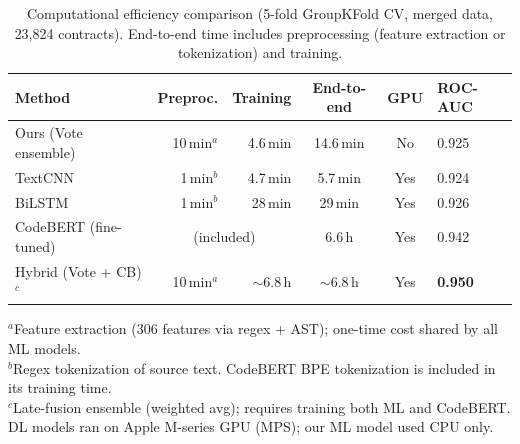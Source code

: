 \begin{table}[t]
\centering
\caption{Computational efficiency comparison (5-fold GroupKFold CV, merged data, 23,824 contracts). End-to-end time includes preprocessing (feature extraction or tokenization) and training.}
\label{tab:efficiency}
\small
\setlength{\tabcolsep}{3.5pt}
\begin{tabular}{lrrccl}
\toprule
\textbf{Method} & \textbf{Preproc.} & \textbf{Training} & \textbf{End-to-end} & \textbf{GPU} & \textbf{ROC-AUC} \\
\midrule
Ours (Vote ensemble) & 10\,min$^a$ & 4.6\,min & 14.6\,min & No & 0.925 \\
TextCNN & 1\,min$^b$ & 4.7\,min & 5.7\,min & Yes & 0.924 \\
BiLSTM & 1\,min$^b$ & 28\,min & 29\,min & Yes & 0.926 \\
CodeBERT (fine-tuned) & \multicolumn{2}{c}{(included)} & 6.6\,h & Yes & 0.942 \\
\midrule
Hybrid (Vote + CB)$^c$ & 10\,min$^a$ & ${\sim}6.8$\,h & ${\sim}6.8$\,h & Yes & \textbf{0.950} \\
\bottomrule
\end{tabular}
\vspace{4pt}

{\footnotesize $^a$Feature extraction (306 features via regex + AST); one-time cost shared by all ML models.}\\
{\footnotesize $^b$Regex tokenization of source text. CodeBERT BPE tokenization is included in its training time.}\\
{\footnotesize $^c$Late-fusion ensemble (weighted avg); requires training both ML and CodeBERT.}\\
{\footnotesize DL models ran on Apple M-series GPU (MPS); our ML model used CPU only.}
\end{table}
